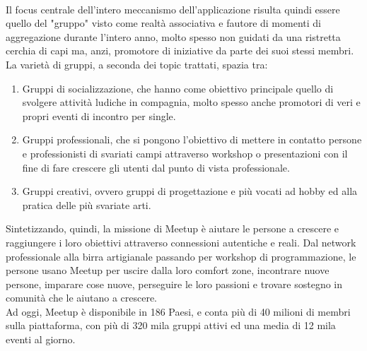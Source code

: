 \documentclass[fleqn,10pt]{SelfArx} %
\begin{document}
{\\
Il focus centrale dell'intero meccanismo dell'applicazione risulta quindi essere quello del "gruppo" visto come realtà associativa e fautore di momenti di aggregazione durante l'intero anno, molto spesso non guidati da una ristretta cerchia di capi ma, anzi, promotore di iniziative da parte dei suoi stessi membri. 
La varietà di gruppi, a seconda dei topic trattati, spazia tra:
\begin{enumerate}
\item Gruppi di socializzazione, che hanno come obiettivo principale quello di svolgere attività ludiche in compagnia, molto spesso anche promotori di veri e propri eventi di incontro per single.
\item Gruppi professionali, che si pongono l'obiettivo di mettere in contatto persone e professionisti di svariati campi attraverso workshop o presentazioni con il fine di fare crescere gli utenti dal punto di vista professionale.
\item Gruppi creativi, ovvero gruppi di progettazione e più vocati ad hobby ed alla pratica delle più svariate arti. \\
\end{enumerate}
Sintetizzando, quindi, la missione di Meetup è aiutare le persone a crescere e raggiungere i loro obiettivi attraverso connessioni autentiche e reali. 
Dal network professionale alla birra artigianale passando per workshop di programmazione, le persone usano Meetup per uscire dalla loro comfort zone, incontrare nuove persone, imparare cose nuove, perseguire le loro passioni e trovare sostegno in comunità che le aiutano a crescere.\\
Ad oggi, Meetup è disponibile in 186 Paesi, e conta più di 40 milioni di membri sulla piattaforma, con più di 320 mila gruppi attivi ed una media di 12 mila eventi al giorno.
}
\end{document}
